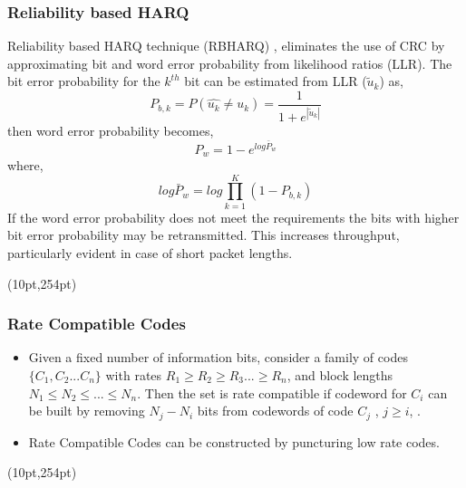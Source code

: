 \documentclass[xcolor=dvipsnames]{beamer}
\newcommand\hyperback[1]{%
  \begin{textblock*}{\paperwidth}(10pt,254pt)
    \raggedright #1\hspace{.5em}
  \end{textblock*}}
\begin{document}
\begin{frame}[label = rbharq]
\frametitle{Reliability based HARQ}
Reliability based HARQ technique (RBHARQ) , eliminates the use of CRC by approximating bit and word error probability from likelihood ratios (LLR).   The bit error probability for the $k^{th}$ bit can be estimated from LLR ($\tilde{u}_k$) as,
\begin{equation}\label{eq:errorllr}
P_{b,k}=P(\hat{u_k} \neq u_k) = \frac{1}{1+e^{|\tilde{u}_k|}}
\end{equation}
then word error probability becomes, 
\begin{equation}
P_w=1-e^{log\bar{P}_w}
\end{equation}
where, $$log\bar{P}_w=log\prod_{k=1}^K (1- P_{b,k})$$ 
If the word error probability does not meet the requirements the bits with higher bit error probability may be retransmitted. This increases throughput, particularly evident in case of short packet lengths.
\hyperback{\hyperlink{HARQp}{}}
\end{frame}
\begin{frame}[label = rcp]
\frametitle{Rate Compatible Codes}
\begin{itemize}
\item Given a fixed number of information bits, consider a family of codes $\{C_1,C_2...C_n\}$  with rates $R_1\geq R_2\geq R_3...\geq R_n$, and block lengths $N_1 \leq N_2 \leq ... \leq N_n$.
Then the set is rate compatible if codeword for $C_i$ can be built by removing $N_j-N_i$ bits from codewords of code $C_j$ , $j\geq i$, .
\item Rate Compatible Codes can be constructed by puncturing low rate codes. 
\end{itemize}
\hyperback{\hyperlink{HARQ}{}}
\end{frame}
\end{document}
